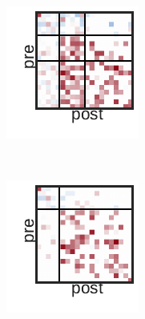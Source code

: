 \begin{figure}[t!]
\begin{subfigure}[b]{1.10in}
  \end{subfigure}
  ~
  \begin{subfigure}[b]{1.10in}
    \centering
    \includegraphics[width=\textwidth]{figures/ch3/SBM-SBM.pdf}
  \end{subfigure}
  ~
  \begin{subfigure}[b]{1.10in}
    \centering
    \includegraphics[width=\textwidth]{figures/ch3/Distance-SBM.pdf}

\end{subfigure}
\end{figure}
